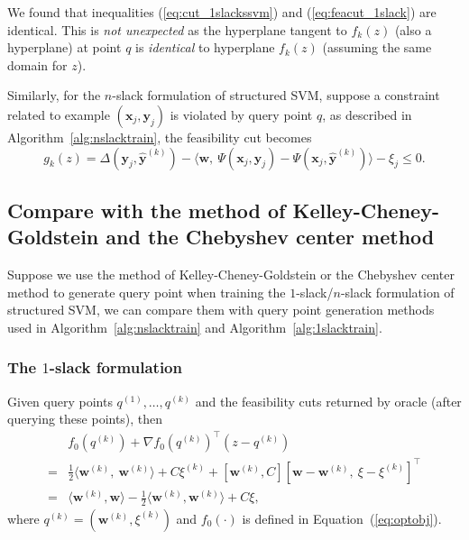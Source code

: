 \documentclass[9pt]{extarticle}
\begin{document}
We found that inequalities (\ref{eq:cut_1slackssvm}) and (\ref{eq:feacut_1slack}) are identical.
This is \emph{not unexpected} as the hyperplane tangent to $f_k(z)$ (also a hyperplane) at point $q$ is \emph{identical} to hyperplane $f_k(z)$
(assuming the same domain for $z$). 

Similarly, for the $n$-slack formulation of structured SVM, 
suppose a constraint related to example $(\mathbf{x}_j, \mathbf{y}_j)$ is violated by query point $q$, 
as described in Algorithm~\ref{alg:nslacktrain}, the feasibility cut becomes
\begin{equation}
\label{eq:feacut_nslack}
g_k(z) = \Delta(\mathbf{y}_j, \hat{\mathbf{y}}^{(k)}) - 
\langle \mathbf{w},~ \Psi(\mathbf{x}_j, \mathbf{y}_j) - \Psi(\mathbf{x}_j, \hat{\mathbf{y}}^{(k)}) \rangle - \xi_j \le 0.
\end{equation}



\subsection{Compare with the method of Kelley-Cheney-Goldstein and the Chebyshev center method}
\label{sec:compare}

Suppose we use the method of Kelley-Cheney-Goldstein or the Chebyshev center method to generate query point 
when training the $1$-slack/$n$-slack formulation of structured SVM,
we can compare them with query point generation methods used in Algorithm~\ref{alg:nslacktrain} and Algorithm~\ref{alg:1slacktrain}.


\subsubsection{The $1$-slack formulation}
\label{sec:compare_1slack}

Given query points $q^{(1)}, \dots, q^{(k)}$ and the feasibility cuts returned by oracle (after querying these points), then
\begin{align*}
 & f_0(q^{(k)}) + \nabla f_0(q^{(k)})^\top (z - q^{(k)}) \\
=& \frac{1}{2} \langle \mathbf{w}^{(k)},~ \mathbf{w}^{(k)} \rangle + C\xi^{(k)} + 
   \left[ \mathbf{w}^{(k)}, C \right] \left[ \mathbf{w} - \mathbf{w}^{(k)},~ \xi - \xi^{(k)} \right]^\top  \\
=& \langle \mathbf{w}^{(k)}, \mathbf{w} \rangle - \frac{1}{2} \langle \mathbf{w}^{(k)}, \mathbf{w}^{(k)} \rangle + C\xi,
\end{align*}
where $q^{(k)} = (\mathbf{w}^{(k)}, \xi^{(k)})$ and $f_0(\cdot)$ is defined in Equation~(\ref{eq:optobj}).
\end{document}
